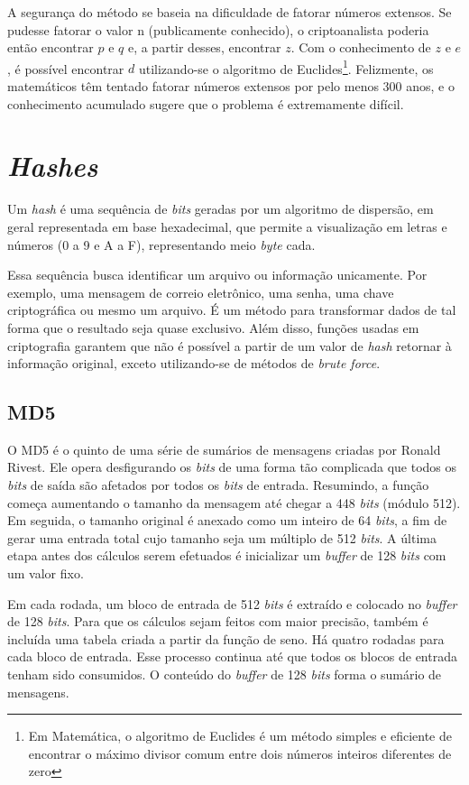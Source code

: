 \documentclass{abnt}
\begin{document}
A segurança do método se baseia na dificuldade de fatorar números extensos. Se pudesse fatorar o valor n (publicamente conhecido), o criptoanalista poderia
então encontrar $p$ e $q$ e, a partir desses, encontrar $z$. Com o conhecimento de $z$ e $e$, é possível encontrar $d$ utilizando-se o algoritmo de
Euclides\footnote{Em Matemática, o algoritmo de Euclides é um método simples e eficiente de encontrar o máximo divisor comum entre dois números inteiros diferentes de zero}.
Felizmente, os matemáticos têm tentado fatorar números extensos por pelo menos 300 anos, e o conhecimento acumulado sugere que o problema é extremamente difícil.


\section{\textit{Hashes}}

Um \textit{hash} é uma sequência de \textit{bits} geradas por um algoritmo de dispersão, em geral representada em base hexadecimal, que permite a visualização em letras e números
(0 a 9 e A a F), representando meio \textit{byte} cada.

Essa sequência busca identificar um arquivo ou informação unicamente. Por exemplo, uma mensagem de correio eletrônico, uma senha, uma chave criptográfica ou mesmo um arquivo.
É um método para transformar dados de tal forma que o resultado seja quase exclusivo. Além disso, funções usadas em criptografia garantem que não é possível a partir de um
valor de \textit{hash} retornar à informação original, exceto utilizando-se de métodos de \textit{brute force}.


\subsection{MD5}

O MD5 é o quinto de uma série de sumários de mensagens criadas por Ronald Rivest. Ele opera desfigurando os \textit{bits} de uma forma tão complicada que todos os \textit{bits} de saída são
afetados por todos os \textit{bits} de entrada. Resumindo, a função começa aumentando o tamanho da mensagem até chegar a 448 \textit{bits} (módulo 512). Em seguida, o tamanho original é
anexado como um inteiro de 64 \textit{bits}, a fim de gerar uma entrada total cujo tamanho seja um múltiplo de 512 \textit{bits}. A última etapa antes dos cálculos serem efetuados é inicializar
um \textit{buffer} de 128 \textit{bits} com um valor fixo. 

Em cada rodada, um bloco de entrada de 512 \textit{bits} é extraído e colocado no \textit{buffer} de 128 \textit{bits}. Para que os cálculos sejam feitos com maior precisão, também é incluída uma tabela
criada a partir da função de seno. Há quatro rodadas para cada bloco de entrada. Esse processo continua até que todos os blocos de entrada tenham sido consumidos. O conteúdo do
\textit{buffer} de 128 \textit{bits} forma o sumário de mensagens.
\end{document}
